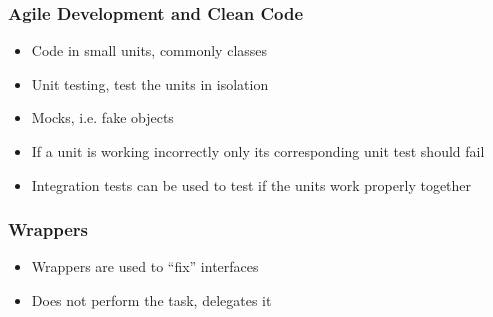 \documentclass{beamer}
\begin{document}



\begin{frame}
\frametitle{Agile Development and Clean Code}
\begin{itemize}
 \item Code in small units, commonly classes
 \item Unit testing, test the units in isolation
 \item Mocks, i.e. fake objects
 \item If a unit is working incorrectly only its corresponding unit test should fail
 \item Integration tests can be used to test if the units work properly together
\end{itemize}

\end{frame}


\begin{frame}
\frametitle{Wrappers}

\begin{itemize}
 \item Wrappers are used to ``fix'' interfaces
 \item Does not perform the task, delegates it
\end{itemize}

\end{frame}
\end{document}
